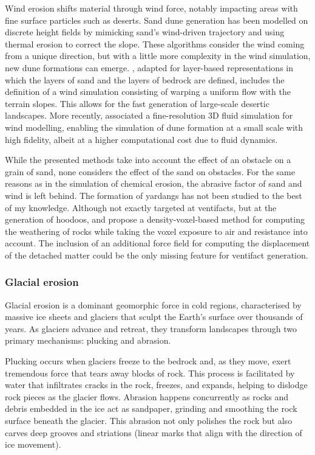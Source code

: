 \smallConclusion

Wind erosion shifts material through wind force, notably impacting areas with fine surface particles such as deserts.  
Sand dune generation has been modelled on discrete height fields \cite{Roa2004} by mimicking sand's wind-driven trajectory and using thermal erosion to correct the slope. These algorithms consider the wind coming from a unique direction, but with a little more complexity in the wind simulation, new dune formations can emerge. \cite{Paris2019b}, adapted for layer-based representations in which the layers of sand and the layers of bedrock are defined, includes the definition of a wind simulation consisting of warping a uniform flow with the terrain slopes. This allows for the fast generation of large-scale desertic landscapes. More recently, \cite{Rosset2024} associated a fine-resolution 3D fluid simulation for wind modelling, enabling the simulation of dune formation at a small scale with high fidelity, albeit at a higher computational cost due to fluid dynamics.

While the presented methods take into account the effect of an obstacle on a grain of sand, none considers the effect of the sand on obstacles. For the same reasons as in the simulation of chemical erosion, the abrasive factor of sand and wind is left behind. The formation of yardangs has not been studied to the best of my knowledge. Although not exactly targeted at ventifacts, but at the generation of hoodoos, \cite{Beardall2007} and \cite{Jones2010} propose a density-voxel-based method for computing the weathering of rocks while taking the voxel exposure to air and resistance into account. The inclusion of an additional force field for computing the displacement of the detached matter could be the only missing feature for ventifact generation.


\subsubsection{Glacial erosion}
Glacial erosion is a dominant geomorphic force in cold regions, characterised by massive ice sheets and glaciers that sculpt the Earth's surface over thousands of years. As glaciers advance and retreat, they transform landscapes through two primary mechanisms: plucking and abrasion.

Plucking occurs when glaciers freeze to the bedrock and, as they move, exert tremendous force that tears away blocks of rock. This process is facilitated by water that infiltrates cracks in the rock, freezes, and expands, helping to dislodge rock pieces as the glacier flows. Abrasion happens concurrently as rocks and debris embedded in the ice act as sandpaper, grinding and smoothing the rock surface beneath the glacier. This abrasion not only polishes the rock but also carves deep grooves and striations (linear marks that align with the direction of ice movement).

